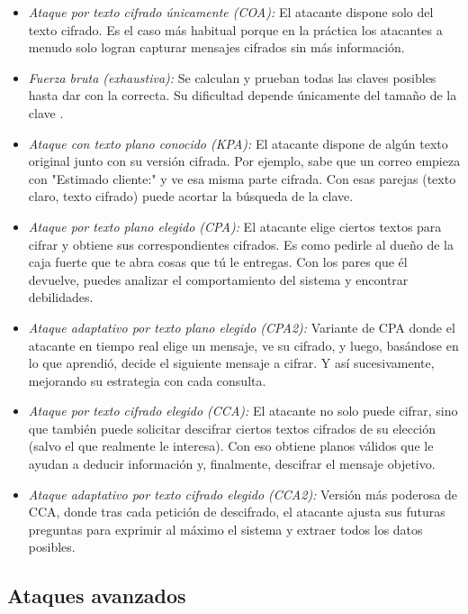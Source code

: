 \begin{itemize}
  \item \emph{Ataque por texto cifrado únicamente (COA):} El atacante dispone solo del texto cifrado. Es el caso más habitual porque en la práctica los atacantes a menudo solo logran capturar mensajes cifrados sin más información.
  \item \emph{Fuerza bruta (exhaustiva):} Se calculan y prueban todas las claves posibles hasta dar con la correcta. Su dificultad depende únicamente del tamaño de la clave \cite{packetlabs-attacks}\cite{fiveable-attacks}.
  \item \emph{Ataque con texto plano conocido (KPA):} El atacante dispone de algún texto original junto con su versión cifrada. Por ejemplo, sabe que un correo empieza con "Estimado cliente:" y ve esa misma parte cifrada. Con esas parejas (texto claro, texto cifrado) puede acortar la búsqueda de la clave.
  \item \emph{Ataque por texto plano elegido (CPA):} El atacante elige ciertos textos para cifrar y obtiene sus correspondientes cifrados. Es como pedirle al dueño de la caja fuerte que te abra cosas que tú le entregas. Con los pares que él devuelve, puedes analizar el comportamiento del sistema y encontrar debilidades.
  \item \emph{Ataque adaptativo por texto plano elegido (CPA2):} Variante de CPA donde el atacante en tiempo real elige un mensaje, ve su cifrado, y luego, basándose en lo que aprendió, decide el siguiente mensaje a cifrar. Y así sucesivamente, mejorando su estrategia con cada consulta.
  \item \emph{Ataque por texto cifrado elegido (CCA):} El atacante no solo puede cifrar, sino que también puede solicitar descifrar ciertos textos cifrados de su elección (salvo el que realmente le interesa). Con eso obtiene planos válidos que le ayudan a deducir información y, finalmente, descifrar el mensaje objetivo.
  \item \emph{Ataque adaptativo por texto cifrado elegido (CCA2):} Versión más poderosa de CCA, donde tras cada petición de descifrado, el atacante ajusta sus futuras preguntas para exprimir al máximo el sistema y extraer todos los datos posibles.
\end{itemize}

\subsection{Ataques avanzados}

